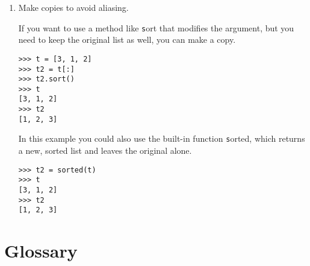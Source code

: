\documentclass[
DIV=11,
fontsize=13,
twoside,
headinclude=false,
titlepage=firstiscover,
abstract=true,
headsepline=true,
footsepline=true,
chapterprefix=true, %
headings=big,
bibliography=totoc,%
captions=tableheading
]{scrbook}
\theoremstyle{definition}
\begin{document}
\begin{enumerate}
\item Make copies to avoid aliasing.

If you want to use a method like {\texttt sort} that modifies
the argument, but you need to keep the original list as
well, you can make a copy.

\begin{lstlisting}
>>> t = [3, 1, 2]
>>> t2 = t[:]
>>> t2.sort()
>>> t
[3, 1, 2]
>>> t2
[1, 2, 3]
\end{lstlisting}

In this example you could also use the built-in function {\texttt sorted},
which returns a new, sorted list and leaves the original alone.

\begin{lstlisting}
>>> t2 = sorted(t)
>>> t
[3, 1, 2]
>>> t2
[1, 2, 3]
\end{lstlisting}

\end{enumerate}



\section{Glossary}
\end{document}
